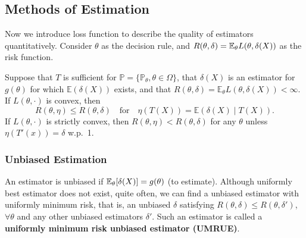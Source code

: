 \subsection{Methods of Estimation}
Now we introduce loss function to describe the quality of estimators quantitatively. Consider $\theta$ as the decision rule, and $R(\theta,\delta) = \mathbb{E}_\theta L(\theta, \delta(X))$ as the risk function.
\begin{thm}
Suppose that $T$ is sufficient for $\mathbb{P} = \{\mathbb{P}_\theta, \theta \in \Omega\}$, that $\delta(X)$ is an estimator for $g(\theta)$ for which $\mathbb{E}(\delta(X))$ exists, and that $R(\theta, \delta) = \mathbb{E}_\theta L(\theta, \delta(X)) < \infty$. If $L(\theta, \cdot)$ is convex, then
\[
R(\theta, \eta) \leq R(\theta, \delta) \quad \text{for} \quad \eta(T(X)) = \mathbb{E}(\delta(X) \mid T(X)).
\]
If $L(\theta, \cdot)$ is strictly convex, then $R(\theta, \eta) < R(\theta, \delta)$ for any $\theta$ unless $\eta(T'(x)) = \delta$ w.p.~1.
\end{thm}

\subsubsection{Unbiased Estimation}
An estimator is unbiased if $\mathbb{E}_\theta[\delta(X)] = g(\theta)$ (to estimate). Although uniformly best estimator does not exist, quite often, we can find a unbiased estimator with uniformly minimum risk, that is, an unbiased $\delta$ satisfying $R(\theta, \delta) \le R(\theta, \delta')$, $\forall \theta$ and any other unbiased estimators $\delta'$. Such an estimator is called a \textbf{uniformly minimum risk unbiased estimator (UMRUE)}.

